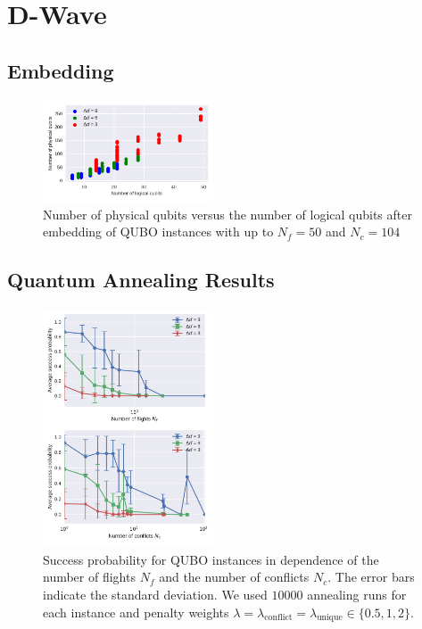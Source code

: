 \section{D-Wave}

\subsection{Embedding}

\begin{figure}[htpb]
    \centering
    \includegraphics[width=0.45\textwidth,natwidth=1,natheight=0]{./pics/physicalVsLogicalNumberOfQubits.pdf}
    \caption{Number of physical qubits versus the number of logical qubits after embedding of QUBO instances with up to $N_f=50$ and $N_c=104$}
    \label{fig:number_of_physical_qubits}
\end{figure}

\subsection{Quantum Annealing Results}

\begin{figure}[htpb]
    \centering
    \includegraphics[width=0.45\textwidth,natwidth=1,natheight=0]{./pics/annealing_results_success_vs_flights_and_conflicts.pdf}
    \caption{Success probability for QUBO instances in dependence of the number of flights $N_f$ and the number of conflicts $N_c$. 
             The error bars indicate the standard deviation.
             We used $10000$ annealing runs for each instance and penalty weights $\lambda = \lambda_\text{conflict} = \lambda_\text{unique} \in \{0.5, 1, 2\}$. 
    }
    \label{fig:success_probability}
\end{figure}

